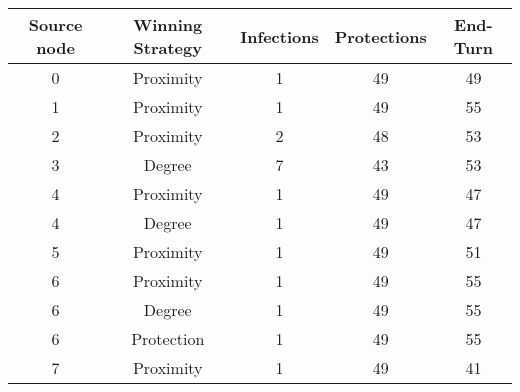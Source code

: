 \documentclass[results.tex]{subfiles}
\begin{document}
    \begin{center}
        \begin{tabular}{| c || c | c | c | c |}
            \hline
            {\bfseries Source node} & {\bfseries Winning Strategy} & {\bfseries Infections} & {\bfseries Protections}
            & {\bfseries End-Turn}
            \\  %
            \hline\hline
            0                       & Proximity                    & 1                      & 49                      & 49                   \\
            \hline
            1                       & Proximity                    & 1                      & 49                      & 55                   \\
            \hline
            2                       & Proximity                    & 2                      & 48                      & 53                   \\
            \hline
            3                       & Degree                       & 7                      & 43                      & 53                   \\
            \hline
            4                       & Proximity                    & 1                      & 49                      & 47                   \\
            \hline
            4                       & Degree                       & 1                      & 49                      & 47                   \\
            \hline
            5                       & Proximity                    & 1                      & 49                      & 51                   \\
            \hline
            6                       & Proximity                    & 1                      & 49                      & 55                   \\
            \hline
            6                       & Degree                       & 1                      & 49                      & 55                   \\
            \hline
            6                       & Protection                   & 1                      & 49                      & 55                   \\
            \hline
            7                       & Proximity                    & 1                      & 49                      & 41                   \\

\end{tabular}
\end{center}
\end{document}
